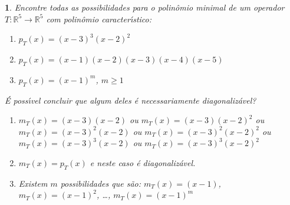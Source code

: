 \documentclass[12pt]{exam}
\newtheorem{exercicio}{}
\newcommand{\real}{\mathbb{R}}
\begin{document}
\begin{exercicio}
  Encontre todas as possibilidades para o polin\^omio minimal de um operador $T : \real^5 \to \real^5$ com polin\^omio caracter{\'\i}stico:
  \begin{enumerate}[label=({\alph*})]
    \item $p_T(x) = (x - 3)^3(x - 2)^2$
    \item $p_T(x) = (x - 1)(x - 2)(x - 3)(x - 4)(x - 5)$
    \item $p_T(x) = (x - 1)^m$, $m \ge 1$
  \end{enumerate}
  \'E poss{\'\i}vel concluir que algum deles \'e necessariamente diagonaliz\'avel?
  \begin{solucao}
    \begin{enumerate}[label=({\alph*})]
      \item $m_T(x) = (x - 3)(x - 2)$ ou $m_T(x) = (x - 3)(x - 2)^2$ ou $m_T(x) = (x - 3)^2(x - 2)$ ou $m_T(x) = (x - 3)^2(x - 2)^2$ ou $m_T(x) = (x - 3)^3(x - 2)$ ou $m_T(x) = (x - 3)^3(x - 2)^2$
      \item $m_T(x) = p_T(x)$ e neste caso \'e diagonaliz\'avel.
      \item Existem $m$ possibilidades que s\~ao: $m_T(x) = (x - 1)$, $m_T(x) = (x - 1)^2$, \dots, $m_T(x) = (x - 1)^m$
      \end{enumerate}
  \end{solucao}
\end{exercicio}
\end{document}
